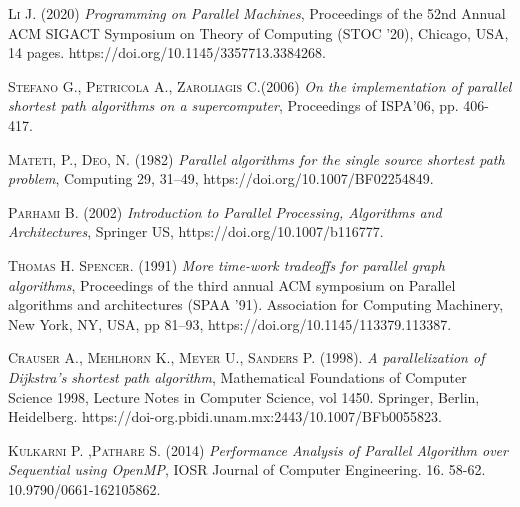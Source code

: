 \documentclass[11pt]{article}
\begin{document}
\begin{thebibliography}{x}
  \textsc{Li J. (2020)} 
 	\textit{Programming on Parallel Machines}, Proceedings of the 52nd Annual ACM SIGACT Symposium on Theory of Computing (STOC ’20), Chicago,  USA, 14 pages. https://doi.org/10.1145/3357713.3384268.

  \textsc{Stefano G., Petricola A., Zaroliagis C.(2006)} 
 	\textit{On the implementation of parallel shortest path algorithms on a supercomputer}, Proceedings of ISPA’06, pp. 406-417.


  \textsc{Mateti, P., Deo, N. (1982)} 
 	\textit{Parallel algorithms for the single source shortest path problem}, Computing 29, 31–49, https://doi.org/10.1007/BF02254849.

  \textsc{Parhami B. (2002)} 
 	\textit{Introduction to Parallel Processing, Algorithms and Architectures}, Springer US, https://doi.org/10.1007/b116777.

  \textsc{Thomas H. Spencer. (1991)} 
 	\textit{More time-work tradeoffs for parallel graph algorithms}, Proceedings of the third annual ACM symposium on Parallel algorithms and architectures (SPAA '91). Association for Computing Machinery, New York, NY, USA, pp 81–93, https://doi.org/10.1145/113379.113387.

  \textsc{Crauser A., Mehlhorn K., Meyer U., Sanders P. (1998).} 
 	\textit{ A parallelization of Dijkstra's shortest path algorithm}, Mathematical Foundations of Computer Science 1998, Lecture Notes in Computer Science, vol 1450. Springer, Berlin, Heidelberg. https://doi-org.pbidi.unam.mx:2443/10.1007/BFb0055823.


  \textsc{Kulkarni P. ,Pathare S. (2014)} 
 	\textit{Performance Analysis of Parallel Algorithm over Sequential using OpenMP}, IOSR Journal of Computer Engineering. 16. 58-62. 10.9790/0661-162105862. 

\end{thebibliography}
\end{document}
